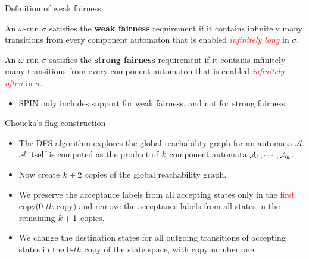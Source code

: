 \documentclass[12pt]{beamer}
\author{林宏陽}
\newcommand{\Automaton}{\mathcal{A}}
\newcommand{\kk}{\mathnormal{k}}
\begin{document}
\begin{frame}{Definition of weak fairness}
		\begin{definition}
			An $\omega$-run $\sigma$ satisfies the \textbf{weak fairness} requirement if it contains infinitely many transitions from every component automaton that is enabled \textcolor{red}{\textit{infinitely long}} in $\sigma$.
		\end{definition}
		\begin{definition}
			An $\omega$-run $\sigma$ satisfies the \textbf{strong fairness} requirement if it contains infinitely many transitions from every component automaton that is enabled \textcolor{red}{\textit{infinitely often}} in $\sigma$.
		\end{definition}
		\begin{itemize}
			\item SPIN only includes support for weak fairness, and not for strong fairness.
		\end{itemize}
\end{frame}

\begin{frame}{Choueka's flag construction}
		\begin{itemize}
			\item The DFS algorithm explores the global reachability graph for an automata $\Automaton$. $\Automaton$ itself is computed as the product of $\kk$ component automata $\Automaton_{1}, \cdots, \Automaton_{\kk}$.
			\item Now create $\kk+2$ copies of the global reachability graph.
			\item We preserve the acceptance labels from all accepting states only in the \textcolor{red}{first} copy($0\text{-}th$ copy) and remove the acceptance labels from all states in the remaining $\kk+1$ copies.
			\item We change the destination states for all outgoing transitions of accepting states in the $0\text{-}th$ copy of the state space, with copy number one.
		\end{itemize}
\end{frame}
\end{document}
